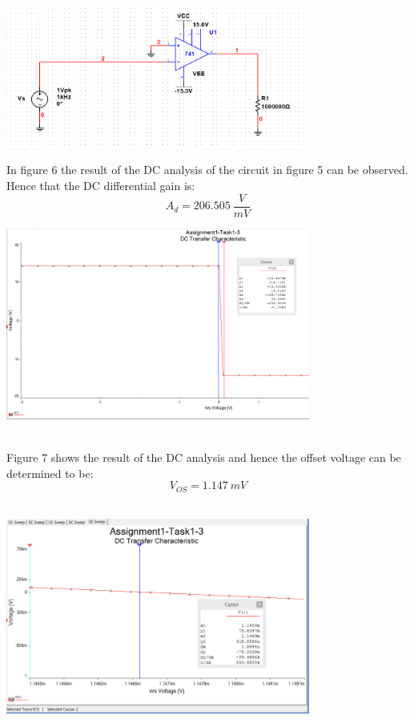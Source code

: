 \documentclass[11pt,a4paper]{article}
\begin{document}
\begin{enumerate}
      \begin{minipage}{\linewidth}
      \centering
      \includegraphics[width=10cm]{Task1-3-Circuit}\\
    \end{minipage}
    
In figure 6 the result of the DC analysis of the circuit in figure 5 can be observed. Hence that the DC differential gain is:
$$A_{d} = 206.505\ \frac{V}{mV} $$    
    
    
        \begin{minipage}{\linewidth}
      \centering
      \includegraphics[width=10cm]{Task1-3-DCAnalysis}\\
    \end{minipage}\\   
    
Figure 7 shows the result of the DC analysis and hence the offset voltage can be determined to be:
$$ V_{OS} = 1.147\ mV $$\\
    
    
\begin{minipage}{\linewidth}
  \centering
    \includegraphics[width=10cm]{Task1-3-Vos}\\
    \end{minipage}\\
    

\end{enumerate}
\end{document}
